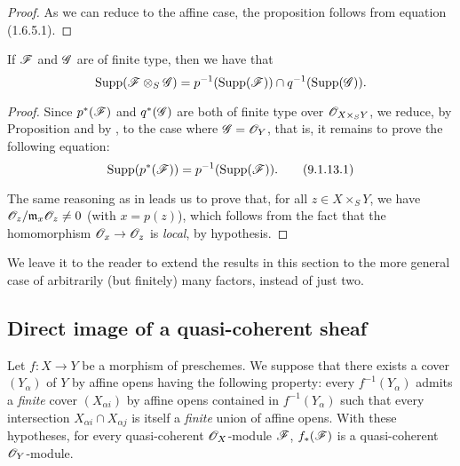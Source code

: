 \begin{proof}
\label{proof-1.9.1.12}
As we can reduce to the affine case, the proposition follows from
equation (1.6.5.1).
\end{proof}

\begin{cor}[9.1.13]
\label{1.9.1.13}
If $\mathscr{F}$ and $\mathscr{G}$ are of finite type, then we have that
\[
  {\mathop{\mathrm{Supp}}\nolimits}(\mathscr{F}\otimes_S\mathscr{G})=p^{-1}({\mathop{\mathrm{Supp}}\nolimits}(\mathscr{F}))\cap q^{-1}({\mathop{\mathrm{Supp}}\nolimits}(\mathscr{G})).
\]
\end{cor}

\begin{proof}
\label{proof-1.9.1.13}
Since $p^*(\mathscr{F})$ and $q^*(\mathscr{G})$ are both of finite type over
$\mathscr{O}_{X\times_S Y}$, we reduce, by Proposition  and
by , to the case where $\mathscr{G}=\mathscr{O}_Y$, that
is, it remains to prove the following equation:
\[
  {\mathop{\mathrm{Supp}}\nolimits}(p^*(\mathscr{F}))=p^{-1}({\mathop{\mathrm{Supp}}\nolimits}(\mathscr{F})).
  \tag{9.1.13.1}
\]

The same reasoning as in  leads us to prove that, for all
$z\in X\times_S Y$, we have $\mathscr{O}_z/\mathfrak{m}_x\mathscr{O}_z\neq0$ (with $x=p(z)$),
which follows from the fact that the homomorphism $\OO_x\to\OO_z$ is \emph{local},
by hypothesis.
\end{proof}

We leave it to the reader to extend the results in this section to the more
general case of arbitrarily (but finitely) many factors, instead of just two.

\subsection{Direct image of a quasi-coherent sheaf}
\label{subsection:direct-image-of-qcoh}

\begin{prop}[9.2.1]
\label{1.9.2.1}
Let $f:X\to Y$ be a morphism of
preschemes. We suppose that there exists a cover $(Y_\alpha)$ of $Y$ by affine
opens having the following property: every $f^{-1}(Y_\alpha)$ admits a
\emph{finite} cover $(X_{\alpha i})$ by affine opens contained in
$f^{-1}(Y_\alpha)$ such that every intersection $X_{\alpha i}\cap X_{\alpha j}$
is itself a \emph{finite} union of affine opens. With these hypotheses, for
every quasi-coherent $\mathscr{O}_X$-module $\mathscr{F}$, $f_*(\mathscr{F})$ is a
quasi-coherent $\mathscr{O}_Y$-module.
\end{prop}

